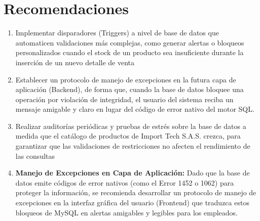 \chapter{Recomendaciones}

\begin{enumerate}
    \item Implementar disparadores (Triggers) a nivel de base de datos que automaticen validaciones más complejas, como generar alertas o bloqueos personalizados cuando el stock de un producto sea insuficiente durante la inserción de un nuevo detalle de venta
    \item Establecer un protocolo de manejo de excepciones en la futura capa de aplicación (Backend), de forma que, cuando la base de datos bloquee una operación por violación de integridad, el usuario del sistema reciba un mensaje amigable y claro en lugar del código de error nativo del motor SQL.
    \item Realizar auditorías periódicas y pruebas de estrés sobre la base de datos a medida que el catálogo de productos de Import Tech S.A.S. crezca, para garantizar que las validaciones de restricciones no afecten el rendimiento de las consultas
    \item \textbf{Manejo de Excepciones en Capa de Aplicación:} Dado que la base de datos emite códigos de error nativos (como el Error 1452 o 1062) para proteger la información, se recomienda desarrollar un protocolo de manejo de excepciones en la interfaz gráfica del usuario (Frontend) que traduzca estos bloqueos de MySQL en alertas amigables y legibles para los empleados.
\end{enumerate}